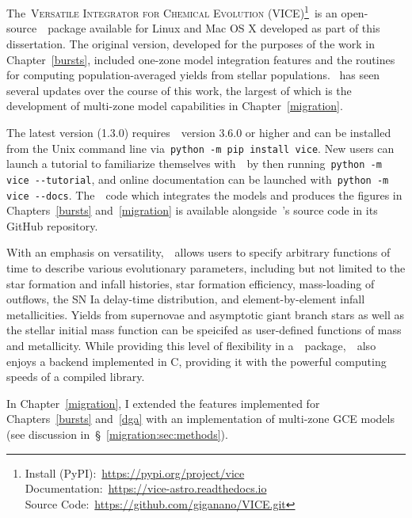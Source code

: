 \documentclass[main.tex]{subfiles}
\begin{document}
\chapter{\vice}
\label{vice}

The~\textsc{Versatile Integrator for Chemical Evolution}
(\textsc{VICE})\footnote{
	Install (PyPI):~\url{https://pypi.org/project/vice}
	\\
	Documentation:~\url{https://vice-astro.readthedocs.io}
	\\
	Source Code:~\url{https://github.com/giganano/VICE.git}
}~is an open-source~\python~package available for Linux and Mac OS X developed
as part of this dissertation.
The original version, developed for the purposes of the work in
Chapter~\ref{bursts}, included one-zone model integration features and the
routines for computing population-averaged yields from stellar populations.
\vice~has seen several updates over the course of this work, the largest of
which is the development of multi-zone model capabilities in
Chapter~\ref{migration}.
\par
The latest version (1.3.0) requires~\python~version 3.6.0 or higher and can be
installed from the Unix command line via~\texttt{python -m pip install vice}.
New users can launch a tutorial to familiarize themselves with~\vice~by then
running~\texttt{python -m vice -{}-tutorial}, and online documentation can be
launched with~\texttt{python -m vice -{}-docs}.
The~\python~code which integrates the models and produces the figures in
Chapters~\ref{bursts} and~\ref{migration} is available alongside~\vice's source
code in its GitHub repository.
\par
With an emphasis on versatility,~\vice~allows users to specify arbitrary
functions of time to describe various evolutionary parameters, including but
not limited to the star formation and infall histories, star formation
efficiency, mass-loading of outflows, the SN Ia delay-time distribution, and
element-by-element infall metallicities.
Yields from supernovae and asymptotic giant branch stars as well as the
stellar initial mass function can be speicifed as user-defined functions of
mass and metallicity.
While providing this level of flexibility in a~\python~package,~\vice~also
enjoys a backend implemented in C, providing it with the powerful computing
speeds of a compiled library.
\par
In Chapter~\ref{migration}, I extended the features implemented for
Chapters~\ref{bursts} and~\ref{dga} with an implementation of multi-zone
GCE models (see discussion in~\S~\ref{migration:sec:methods}).
\end{document}
